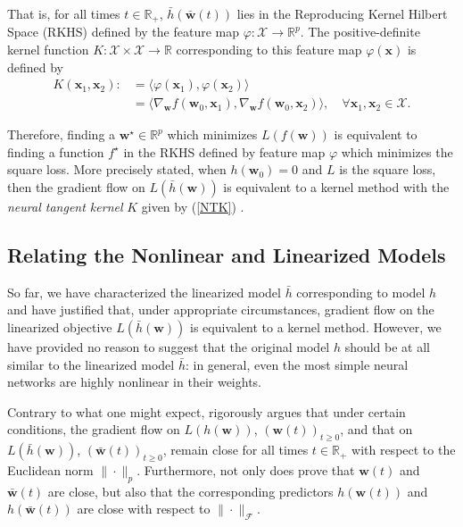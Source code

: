 \documentclass{article}
\begin{document}
That is, for all times $t \in \mathbb{R}_+$, $\bar{h}(\boldsymbol{\bar{w}}(t))$ lies in the Reproducing Kernel Hilbert Space (RKHS) defined by the feature map $\varphi: \mathcal{X} \rightarrow \mathbb{R}^p$. The positive-definite kernel function $K: \mathcal{X} \times \mathcal{X} \rightarrow \mathbb{R}$ corresponding to this feature map $\varphi(\boldsymbol{x})$ is defined by
\begin{align}
    K(\boldsymbol{x}_1, \boldsymbol{x}_2) :&= \langle \varphi(\boldsymbol{x}_1), \varphi(\boldsymbol{x}_2) \rangle \nonumber \\
    &= \langle \nabla_{\boldsymbol{w}} f(\boldsymbol{w}_0, \boldsymbol{x}_1), \nabla_{\boldsymbol{w}} f(\boldsymbol{w}_0, \boldsymbol{x}_2) \rangle, \quad \forall \boldsymbol{x}_1, \boldsymbol{x}_2 \in \mathcal{X}\label{NTK}.
\end{align}

Therefore, finding a $\boldsymbol{w}^{\star} \in \mathbb{R}^p$ which minimizes $L(f(\boldsymbol{w}))$ is equivalent to finding a function $f^{\star}$ in the RKHS defined by feature map $\varphi$ which minimizes the square loss. More precisely stated, when $h(\boldsymbol{w}_0) = 0$ and $L$ is the square loss, then the gradient flow on $L(\bar{h}(\boldsymbol{w}))$ is equivalent to a kernel method with the \textit{neural tangent kernel} $K$ given by (\ref{NTK}) \cite{chizat2018lazy} \cite{jacot2018neural}.

\subsection{Relating the Nonlinear and Linearized Models}

So far, we have characterized the linearized model $\bar{h}$ corresponding to model $h$ and have justified that, under appropriate circumstances, gradient flow on the linearized objective $L(\bar{h}(\boldsymbol{w}))$ is equivalent to a kernel method. However, we have provided no reason to suggest that the original model $h$ should be at all similar to the linearized model $\bar{h}$: in general, even the most simple neural networks are highly nonlinear in their weights. 

Contrary to what one might expect, \cite{chizat2018lazy} rigorously argues that under certain conditions, the gradient flow on $L(h(\boldsymbol{w}))$, $(\boldsymbol{w}(t))_{t \geq 0}$, and that on $L(\bar{h}(\boldsymbol{w}))$, $(\boldsymbol{\bar{w}}(t))_{t \geq 0}$, remain close for all times $t \in \mathbb{R}_+$ with respect to the Euclidean norm $\| \cdot \|_p$. Furthermore, not only does \cite{chizat2018lazy} prove that $\boldsymbol{w}(t)$ and $\boldsymbol{\bar{w}}(t)$ are close, but also that the corresponding predictors $h(\boldsymbol{w}(t))$ and $h(\boldsymbol{\bar{w}}(t))$ are close with respect to $\| \cdot \|_{\mathcal{F}}$.
\end{document}
